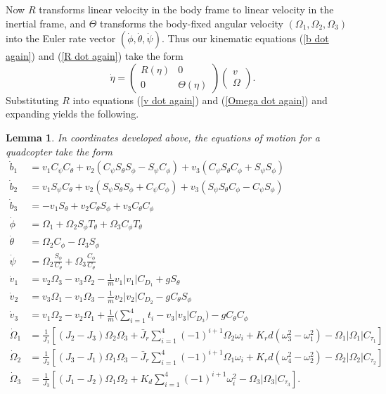 \documentclass{aims}
\newtheorem{lemma}[theorem]{Lemma}
\theoremstyle{definition}
\begin{document}
    
Now $R$ transforms linear velocity in the body frame to linear velocity in the inertial frame, and
$\Theta$ transforms the body-fixed angular velocity $(\Omega_1, \Omega_2, \Omega_3)$ into the Euler rate vector $(\dot{\phi}, \dot{\theta}, \dot{\psi})$.
Thus our kinematic equations (\ref{b dot again}) and (\ref{R dot again}) take the form
 $$\dot{\eta}=\begin{pmatrix}R(\eta)&0\\0&\Theta(\eta)\end{pmatrix}\begin{pmatrix}v\\\Omega\end{pmatrix}.$$
Substituting $R$ into equations (\ref{v dot again}) and (\ref{Omega dot again}) and expanding yields the following.
 
 \begin{lemma} \label{lemma: eqns in coords}
 In coordinates developed above, the equations of motion for a quadcopter take the form
 \begin{align}
 \dot{b}_1&=v_1C_\psi C_\theta+v_2(C_\psi S_\theta S_\phi - S_\psi C_\phi) +v_3(C_\psi S_\theta C_\phi + S_\psi S_\phi)\\
        \dot{b}_2&=v_1S_\psi C_\theta+v_2(S_\psi S_\theta S_\phi + C_\psi C_\phi)+v_3(S_\psi S_\theta C_\phi - C_\psi S_\phi)\\
        \dot{b}_3&=-v_1S_\theta +v_2C_\theta S_\phi +v_3C_\theta C_\phi\\
        \dot{\phi}&=\Omega_1+\Omega_2S_\phi T_\theta +\Omega_3C_\phi T_\theta\\
        \dot{\theta}&=\Omega_2C_\phi-\Omega_3S_\phi\\
        \dot{\psi}&=\Omega_2\frac{S_\phi}{C_\theta}+\Omega_3\frac{C_\phi}{C_\theta} \\        
 \dot{v}_1&=v_2\Omega_3-v_3\Omega_2-\frac{1}{m}v_1|v_1|C_{D_1}+gS_\theta\\
        \dot{v}_2&=v_3\Omega_1-v_1\Omega_3-\frac{1}{m}v_2|v_2|C_{D_2}-gC_\theta S_\phi\\
        \dot{v}_3&=v_1\Omega_2-v_2\Omega_1+\frac{1}{m}\Bigg(\sum_{i=1}^4 t_i-v_3|v_3|C_{D_3}\Bigg)-gC_\theta C_\phi \\        
  \dot{\Omega}_1&=\frac{1}{J_{1}}\left[(J_{2}-J_{3})\Omega_2\Omega_3+\bar J_r\sum_{i=1}^4(-1)^{i+1}\Omega_2\omega_i
  +K_rd(\omega_3^2-\omega_1^2)-\Omega_1|\Omega_1|C_{\tau_1}\right]\\
        \dot{\Omega}_2&=\frac{1}{J_{2}}\left[(J_{3}-J_{1})\Omega_1\Omega_3-\bar J_r\sum_{i=1}^4(-1)^{i+1}\Omega_1\omega_i
        +K_rd(\omega_4^2-\omega_2^2)-\Omega_2|\Omega_2|C_{\tau_2}\right]\\
 \dot{\Omega}_3&=\frac{1}{J_{3}}\left[(J_{1}-J_{2})\Omega_1\Omega_2+K_d\sum_{i=1}^4(-1)^{i+1}\omega_i^2-\Omega_3|\Omega_3|C_{\tau_3}\right].        
 \end{align}
 \end{lemma}
 
\end{document}
